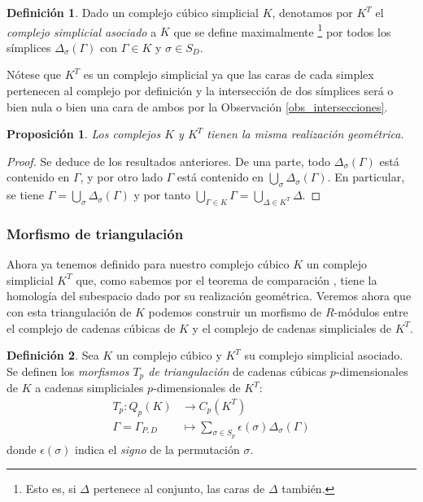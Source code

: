 \documentclass[12pt,a4paper,twoside]{article} %
\theoremstyle{plain}
\newtheorem{proposicion}{Proposición}[subsection]
\theoremstyle{definition}
\newtheorem{definicion}{Definición}[subsection]
\newcommand{\Map}[5]{\begin{align*}
					#1\colon   #2 &\to     #3 \\
							   #4 &\mapsto #5
					\end{align*}}
\begin{document}
\begin{definicion}
Dado un complejo cúbico simplicial $K$, denotamos por $K^T$ el \emph{complejo simplicial asociado} a $K$ que se define maximalmente \footnote{Esto es, si $\Delta$ pertenece al conjunto, las caras de $\Delta$ también.} por todos los símplices $\Delta_\sigma(\Gamma)$ con $\Gamma \in K$ y $\sigma \in S_D$.
\end{definicion}

Nótese que $K^T$ es un complejo simplicial ya que las caras de cada simplex pertenecen al complejo por definición y la intersección de dos símplices será o bien nula o bien una cara de ambos por la Observación \ref{obs_intersecciones}.

\begin{proposicion}
Los complejos $K$ y $K^T$ tienen la misma realización geométrica.
\end{proposicion}

\begin{proof}
Se deduce de los resultados anteriores. De una parte, todo $\Delta_\sigma (\Gamma)$ está contenido en $\Gamma$, y por otro lado $\Gamma$ está contenido en $\bigcup_{\sigma} \Delta_\sigma (\Gamma)$. En particular, se tiene $\Gamma = \bigcup_{\sigma} \Delta_\sigma (\Gamma)$ y por tanto $\bigcup_{\Gamma \in K} \Gamma = \bigcup_{\Delta \in K^T} \Delta $.
\end{proof}

\subsubsection{Morfismo de triangulación}

Ahora ya tenemos definido para nuestro complejo cúbico $K$ un complejo simplicial $K^T$ que, como sabemos por el teorema de comparación \cite{Navarro}, tiene la homología del subespacio dado por su realización geométrica. Veremos ahora que con esta triangulación de $K$ podemos construir un morfismo de $R$-módulos entre el complejo de cadenas cúbicas de $K$ y el complejo de cadenas simpliciales de $K^T$.

\begin{definicion}
Sea $K$ un complejo cúbico y $K^T$ su complejo simplicial asociado. Se definen los \emph{morfismos $T_p$ de triangulación} de cadenas cúbicas $p$-dimensionales de $K$ a cadenas simpliciales $p$-dimensionales de $K^T$:
\Map{T_p}{Q_p(K)}{C_p(K^T)}{\Gamma=\Gamma_{P,D}}{\sum_{\sigma \in S_p} \epsilon(\sigma) \Delta_\sigma(\Gamma)}
donde $\epsilon(\sigma)$ indica el \emph{signo} de la permutación $\sigma$.
\end{definicion}
\end{document}
